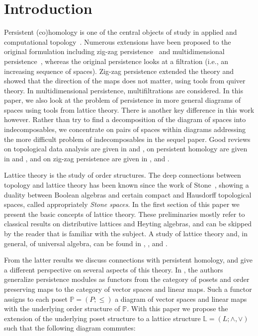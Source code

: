 \documentclass[10pt]{amsart}
\newcommand{\La}{\mathbb{L}}
\newcommand{\Po}{\mathbb{P}}
\begin{document}
\linenumbers



\section*{Introduction}
\label{Introduction}

Persistent (co)homology is one of the central objects of study in applied and computational topology~\cite{Edel00}. Numerous extensions have been proposed to the original formulation including zig-zag persistence~\cite{ZigZag} and multidimensional persistence~\cite{Carl09}, whereas the original persistence looks at a filtration (i.e., an increasing sequence of spaces). Zig-zag persistence extended the theory and showed that the direction of the maps does not matter, using tools from quiver theory. In multidimensional persistence, multifiltrations are considered. In this paper, we also look at the problem of persistence in more general diagrams of spaces using tools from lattice theory. There is another key difference in this work however. Rather than try to find a decomposition of the diagram of spaces into indecomposables, we concentrate on pairs of spaces within diagrams addressing the more difficult problem of indecomposables in the sequel paper. 
Good reviews on topological data analysis are given in \cite{TD} and \cite{Zom05}, on persistent homology are given in \cite{Skr13} and \cite{Zom13}, and on zig-zag persistence are given in \cite{ZigZag}, \cite{Car09} and \cite{Oud12}.

Lattice theory is the study of order structures. The deep connections between topology and lattice theory has been known since the work of Stone~\cite{Joh86}, showing a duality between Boolean algebras and certain compact and Hausdorff topological spaces, called appropriately \emph{Stone spaces}.  
In the first section of this paper we present the basic concepts of lattice theory.
These preliminaries mostly refer to classical results on distributive lattices and Heyting algebras, and can be skipped by the reader that is familiar with the subject.
A study of lattice theory and, in general, of universal algebra, can be found in \cite{Ba40}, \cite{Sa81}, \cite{Gr71} and \cite{Gr79}.

From the latter results we discuss connections with persistent homology, and give a different perspective on several aspects of this theory. 
In \cite{Bu14}, the authors generalize persistence modules as functors from the category of posets and order preserving maps to the category of vector spaces and linear maps. 
Such a functor assigns to each poset $\Po=(P;\leq)$ a diagram of vector spaces and linear maps with the underlying order structure of $\Po$. 
With this paper we propose the extension of the underlying poset structure to a lattice structure $\La=(L;\wedge,\vee)$ such that the following diagram commutes: 
\end{document}
